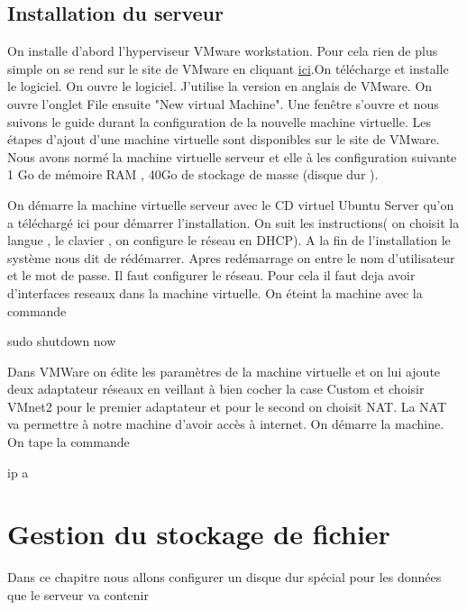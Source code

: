 \documentclass[a4paper,12pt,french]{report} %
\begin{document}
\subsection{Installation du serveur}
On installe d'abord l'hyperviseur VMware workstation. Pour cela rien de plus simple on se rend sur le site de VMware en cliquant \href{https://my.vmware.com/en/web/vmware/free}{ici}.On télécharge et installe le logiciel. On ouvre le logiciel. J'utilise la version en anglais de VMware. On ouvre l'onglet File ensuite "New virtual Machine". Une fenêtre s'ouvre et nous suivons le guide durant la configuration de la nouvelle machine virtuelle. Les étapes d'ajout d'une machine virtuelle sont disponibles sur le site de VMware. Nous avons normé la machine virtuelle serveur et elle à les configuration suivante 1 Go de mémoire RAM , 40Go de stockage de masse (disque dur ).

 
On démarre la machine virtuelle serveur avec le CD virtuel Ubuntu Server qu'on a téléchargé ici pour démarrer l'installation. On suit les instructions( on choisit la langue , le clavier , on configure le réseau en DHCP). A la fin de l'installation le système nous dit de rédémarrer. Apres redémarrage on entre le nom d'utilisateur et le mot de passe. Il faut configurer le réseau. 
Pour cela il faut deja avoir d'interfaces reseaux dans la machine virtuelle. On éteint la machine avec la commande 
\begin{exempleConsole}
	sudo shutdown now 
\end{exempleConsole}
Dans VMWare on édite les paramètres de la machine virtuelle et on lui ajoute deux adaptateur réseaux en veillant à bien cocher la case Custom et choisir VMnet2 pour le premier adaptateur et pour le second on choisit NAT. La NAT va permettre à notre machine d'avoir accès à internet. On démarre la machine. On tape la commande

\begin{exempleConsole}
ip a
\end{exempleConsole}
\section{Gestion du stockage de fichier}
Dans ce chapitre nous allons configurer un disque dur spécial pour les données que le serveur va contenir
\end{document}
